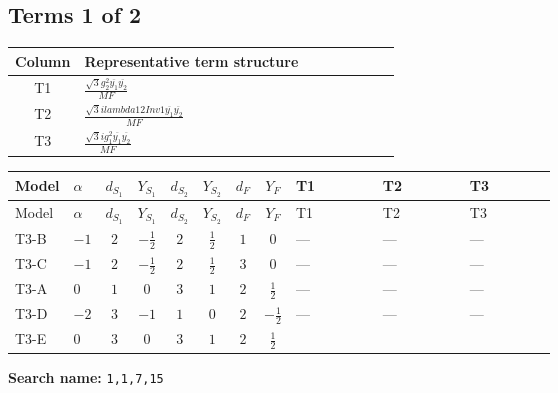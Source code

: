 \documentclass[8pt]{article}
\begin{document}
\begin{landscape}
\subsection*{Terms 1 of 2}
\begin{center}
\begin{tabular}{@{}c >{\raggedright\arraybackslash}p{0.82\linewidth}@{}}
\toprule
Column & Representative term structure \\
\midrule
T1 & \(\displaystyle \frac{\sqrt{3} g_{2}^{2} \overline{y_{1}} \overline{y_{2}}}{MF}\) \\
\midrule
T2 & \(\displaystyle \frac{\sqrt{3} i lambda12Inv1 \overline{y_{1}} \overline{y_{2}}}{MF}\) \\
\midrule
T3 & \(\displaystyle \frac{\sqrt{3} i g_{1}^{2} \overline{y_{1}} \overline{y_{2}}}{MF}\) \\
\midrule
\bottomrule
\end{tabular}
\end{center}
\smallskip
\tiny
\begin{longtable}{@{}llcccccc >{\raggedright\arraybackslash}p{0.21\linewidth} >{\raggedright\arraybackslash}p{0.21\linewidth} >{\raggedright\arraybackslash}p{0.21\linewidth}@{}}
\toprule
Model & $\alpha$ & $d_{S_1}$ & $Y_{S_1}$ & $d_{S_2}$ & $Y_{S_2}$ & $d_F$ & $Y_F$ & T1 & T2 & T3 \\
\midrule
\endfirsthead
\toprule
Model & $\alpha$ & $d_{S_1}$ & $Y_{S_1}$ & $d_{S_2}$ & $Y_{S_2}$ & $d_F$ & $Y_F$ & T1 & T2 & T3 \\
\midrule
\endhead
T3-B & $-1$ & $2$ & $-\frac{1}{2}$ & $2$ & $\frac{1}{2}$ & $1$ & $0$ & --- & --- & --- \\
\midrule
T3-C & $-1$ & $2$ & $-\frac{1}{2}$ & $2$ & $\frac{1}{2}$ & $3$ & $0$ & --- & --- & --- \\
\midrule
T3-A & $0$ & $1$ & $0$ & $3$ & $1$ & $2$ & $\frac{1}{2}$ & --- & --- & --- \\
\midrule
T3-D & $-2$ & $3$ & $-1$ & $1$ & $0$ & $2$ & $-\frac{1}{2}$ & --- & --- & --- \\
\midrule
T3-E & $0$ & $3$ & $0$ & $3$ & $1$ & $2$ & $\frac{1}{2}$ & \scriptsize\adjustbox{max width=\linewidth}{$\begin{gathered} \frac{\sqrt{3} g_{2}^{2} \overline{y_{1}} \overline{y_{2}}}{6 MF}\end{gathered}$} & \scriptsize\adjustbox{max width=\linewidth}{$\begin{gathered} - \frac{\sqrt{3} i lambda12Inv1 \overline{y_{1}} \overline{y_{2}}}{6 MF}\end{gathered}$} & \scriptsize\adjustbox{max width=\linewidth}{$\begin{gathered} \frac{\sqrt{3} i g_{1}^{2} \overline{y_{1}} \overline{y_{2}}}{8 MF}\end{gathered}$} \\
\midrule
\bottomrule
\end{longtable}
\clearpage
\noindent\textbf{Search name: }\texttt{1,1,7,15}\par\smallskip

\end{landscape}
\end{document}
